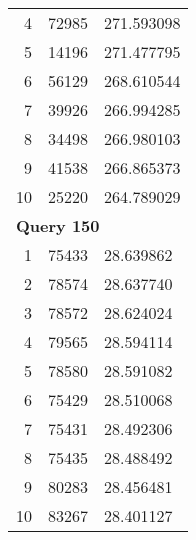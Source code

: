 \begin{longtable}[{p}]{@{}rrp{}@{}}
4 & 72985 & 271.593098 \\
5 & 14196 & 271.477795 \\
6 & 56129 & 268.610544 \\
7 & 39926 & 266.994285 \\
8 & 34498 & 266.980103 \\
9 & 41538 & 266.865373 \\
10 & 25220 & 264.789029 \\
\midrule
\multicolumn{3}{l}{\bfseries Query 150} \\
1 & 75433 & 28.639862 \\
2 & 78574 & 28.637740 \\
3 & 78572 & 28.624024 \\
4 & 79565 & 28.594114 \\
5 & 78580 & 28.591082 \\
6 & 75429 & 28.510068 \\
7 & 75431 & 28.492306 \\
8 & 75435 & 28.488492 \\
9 & 80283 & 28.456481 \\
10 & 83267 & 28.401127 \\
\end{longtable}
